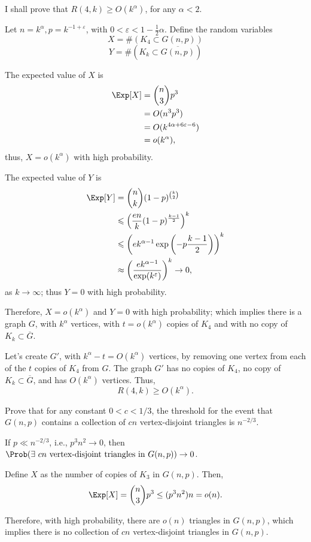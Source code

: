\documentclass[10pt, a4paper]{article}
\begin{document}
\begin{sol}
	I shall prove that $R(4, k) \geqslant O(k^\alpha)$, for any $\alpha < 2$.

	Let $n = k^\alpha, p = k^{-1 + \varepsilon}$, with $0 < \varepsilon < 1 - \frac{1}{2}\alpha$. Define the random variables
	\[
		X = \#(K_4 \subset G(n, p))
	\]
	\[
		Y = \#(K_k \subset \overline{G(n, p)})
	\]

	The expected value of $X$ is \begin{align*}
		\Exp[X] &= \binom{n}{3} p^3 \\&= O(n^3p^3) \\&= O(k^{4\alpha + 6\varepsilon - 6}) \\&= o(k^\alpha),
	\end{align*}
	thus, $X = o(k^\alpha)$ with high probability.

	The expected value of $Y$ is \begin{align*}
		\Exp[Y] &= \binom{n}{k}(1-p)^{\binom{k}{2}} \\&\leqslant \left(\frac{en}{k}(1-p)^{\frac{k-1}{2}}\right)^k\\
		&\leqslant \left( ek^{\alpha - 1} \exp\left(-p\frac{k-1}{2}\right)\right)^k \\
		&\approx \left( \frac{ek^{\alpha - 1}}{\exp(k^\varepsilon)} \right)^k \to 0,
	\end{align*}
	as $k \to \infty$; thus $Y = 0$ with high probability.

	Therefore, $X = o(k^\alpha)$ and $Y = 0$ with high probability; which implies there is a graph $G$, with $k^\alpha$ vertices, with $t = o(k^\alpha)$ copies of $K_4$ and with no copy of $K_k \subset \overline G$. 

	Let's create $G'$, with $k^\alpha - t = O(k^\alpha)$ vertices, by removing one vertex from each of the $t$ copies of $K_4$ from $G$. The graph $G'$ has no copies of $K_4$, no copy of $K_k \subset \overline G$, and has $O(k^\alpha)$ vertices. Thus, \[
		R(4, k) \geqslant O(k^\alpha).
	\]
\end{sol}

\newpage
\begin{prob}\label{prob:4}
	Prove that for any constant $0 < c < 1/3$, the threshold for the event that $G(n, p)$ contains a collection of $cn$ vertex-disjoint triangles is $n^{-2/3}$.
\end{prob}

\begin{prop}\label{prob:4:prop:1}
	If $p \ll n^{-2/3}$, i.e., $p^3n^2 \to 0$, then $\Prob(\exists\ cn \text{ vertex-disjoint triangles in }G(n, p)) \to 0$.
\end{prop}
\begin{dem}
	Define $X$ as the number of copies of $K_3$ in $G(n, p)$. Then, \[
		\Exp[X] = \binom{n}{3}p^3 \le (p^3n^2)n = o(n).
	\]

	Therefore, with high probability, there are $o(n)$ triangles in $G(n, p)$, which implies there is no collection of $cn$ vertex-disjoint triangles in $G(n, p)$.
\end{dem}
\end{document}
